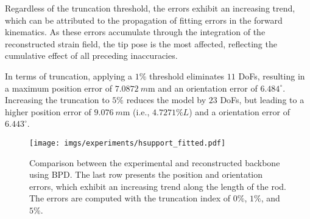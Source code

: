 Regardless of the truncation threshold, the errors exhibit an increasing trend, which can be attributed to the propagation of fitting errors in the forward kinematics. As these errors accumulate through the integration of the reconstructed strain field, the tip pose is the most affected, reflecting the cumulative effect of all preceding inaccuracies.

In terms of truncation, applying a $1\%$ threshold eliminates $11$ \ac{DoFs}, resulting in a maximum position error of $\SI{7.0872}{m\meter}$ and an orientation error of $6.484^{\circ}$. Increasing the truncation to $5\%$ reduces the model by $23$ \ac{DoFs}, but leading to a higher position error of $\SI{9.076}{m\meter}$ (i.e., $4.7271 \% L$) and a orientation error of $6.443^{\circ}$.

%     
\begin{figure*}
    \centering
    \texttt{[image: imgs/experiments/hsupport\_fitted.pdf]}
    \caption{Comparison between the experimental and reconstructed backbone using \ac{BPD}. The last row presents the position and orientation errors, which exhibit an increasing trend along the length of the rod. The errors are computed with the truncation index of $0\%$, $1\%$, and $5\%$.}
    \label{fig:bpd_se3}
\end{figure*}
%
% 
